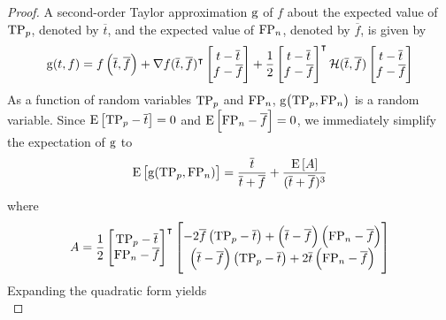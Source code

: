 \begin{proof}
A second-order Taylor approximation $\Fun{g}$ of $f$ about the expected value of $\mathrm{TP}_p$, denoted by $\overline{t}$, and the expected value of $\mathrm{FP}_n$, denoted by $\overline{f}$, is given by
\begin{equation}
    \Fun{g}(t,f) =
    f\left(\overline{t},\overline{f}\right) + \nabla f(\overline{t},\overline{f})^{\intercal}
    \begin{bmatrix}
        t - \overline{t}\\
        f - \overline{f}\\
    \end{bmatrix}
    + \frac{1}{2}
    \begin{bmatrix}
        t - \overline{t}\\
        f - \overline{f}\\
    \end{bmatrix}^{\intercal}
    \mathcal{H}(\overline{t},\overline{f})
    \begin{bmatrix}
        t - \overline{t}\\
        f - \overline{f}\\
    \end{bmatrix}
\end{equation}
As a function of random variables $\mathrm{TP}_p$ and $\mathrm{FP}_n$, $\Fun{g}\!\left(\TP_p,\FP_n\right)$ is a random variable.
Since $\Expect{\TP_p - \overline{t}} = 0$ and $\Expect{\FP_n - \overline{f}} = 0$, we immediately simplify the expectation of $\Fun{g}$ to
\begin{equation}
\label{eq:proof_hess1}
    \Expect{\Fun{g}(\TP_p,\FP_n)} = \frac{\overline{t}}{\overline{t}+\overline{f}} + \frac{\Expect{A}}{(\overline{t} + \overline{f})^3}
\end{equation}
where
\begin{equation}
    A = \frac{1}{2}
    \begin{bmatrix}
        \mathrm{TP}_p - \overline{t}\\
        \mathrm{FP}_n - \overline{f}
    \end{bmatrix}^{\intercal}
    \begin{bmatrix}
        -2 \overline{f} \left(\mathrm{TP}_p - \overline{t}\right) + \left(\overline{t}-\overline{f}\right)\left(\mathrm{FP}_n - \overline{f}\right)\\
        \left(\overline{t}-\overline{f}\right)\left(\mathrm{TP}_p - \overline{t}\right) + 2 \overline{t}\left(\mathrm{FP}_n - \overline{f}\right)
    \end{bmatrix}
\end{equation}
Expanding the quadratic form yields
\begin{equation}

\end{equation}
\end{proof}
